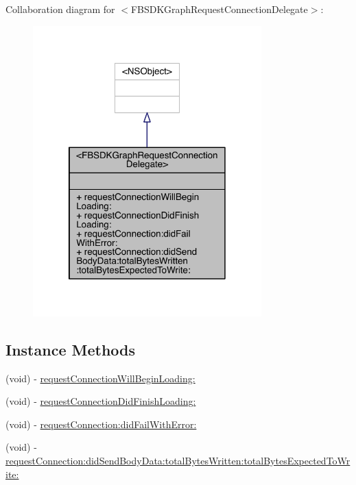 Collaboration diagram for $<$F\-B\-S\-D\-K\-Graph\-Request\-Connection\-Delegate$>$\-:
\nopagebreak
\begin{figure}[H]
\begin{center}
\leavevmode
\includegraphics[width=250pt]{protocol_f_b_s_d_k_graph_request_connection_delegate-p__coll__graph}
\end{center}
\end{figure}
\subsection*{Instance Methods}
\begin{DoxyCompactItemize}
\item 
(void) -\/ \hyperlink{protocol_f_b_s_d_k_graph_request_connection_delegate-p_a54173754894dff5ec20c68afccecdc2e}{request\-Connection\-Will\-Begin\-Loading\-:}
\item 
(void) -\/ \hyperlink{protocol_f_b_s_d_k_graph_request_connection_delegate-p_a486441eb843cc4b8e6124e30f6cea3ff}{request\-Connection\-Did\-Finish\-Loading\-:}
\item 
(void) -\/ \hyperlink{protocol_f_b_s_d_k_graph_request_connection_delegate-p_a94633c21d5335b826aa4d6fa4082f129}{request\-Connection\-:did\-Fail\-With\-Error\-:}
\item 
(void) -\/ \hyperlink{protocol_f_b_s_d_k_graph_request_connection_delegate-p_a184a50d9e9b357f1e9a927d810ba4b15}{request\-Connection\-:did\-Send\-Body\-Data\-:total\-Bytes\-Written\-:total\-Bytes\-Expected\-To\-Write\-:}
\end{DoxyCompactItemize}


